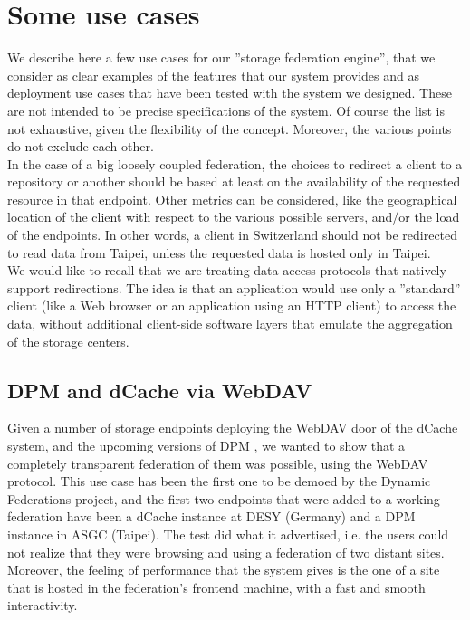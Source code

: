 \documentclass[12pt]{article} %
\begin{document}
\section{Some use cases}
We describe here a few use cases for our ''storage federation engine'', that we consider as clear examples of the features that our system provides and as deployment use cases that have been tested with the system we designed. These are not intended to be precise specifications of the system. Of course the list is not exhaustive, given the flexibility of the concept. Moreover, the various points do not exclude each other.\\

In the case of a big loosely coupled federation, the choices to redirect a client to a repository or another should be based at least on the availability of the requested resource in that endpoint. Other metrics can be considered, like the geographical location of the client with respect to the various possible servers, and/or the load of the endpoints.
In other words, a client in Switzerland should not be redirected to read data from Taipei, unless the requested data is hosted only in Taipei.\\

We would like to recall that we are treating data access protocols that natively support redirections. The idea is that an application would use only a ''standard'' client (like a Web browser or an application using an HTTP client) to access the data, without additional client-side software layers that emulate the aggregation of the storage centers.

\subsection{DPM and dCache via WebDAV}

Given a number of storage endpoints deploying the WebDAV door of the dCache system, and the upcoming versions of DPM \cite{dpmfuture} \cite{dpmnew}, we wanted to show that a completely transparent federation of them was possible, using the WebDAV protocol.
This use case has been the first one to be demoed by the Dynamic Federations project, and the first two endpoints that were added to a working federation have been a dCache instance at DESY (Germany) and a DPM instance in ASGC (Taipei). The test did what it advertised, i.e. the users could not realize that they were browsing and using a federation of two distant sites. Moreover, the feeling of performance that the system gives is the one of a site that is hosted in the federation's frontend machine, with a fast and smooth interactivity.
\end{document}
